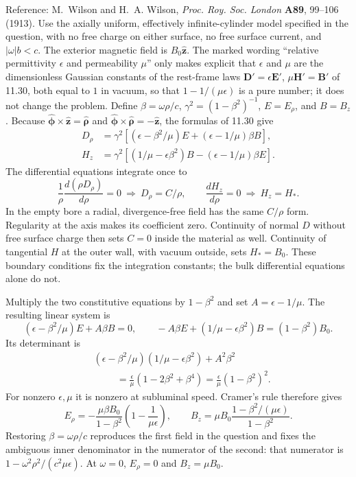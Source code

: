 Reference: M.~Wilson and H.~A. Wilson, \emph{Proc. Roy. Soc. London} \textbf{A89}, 99--106 (1913).
\solution
Use the axially uniform, effectively infinite-cylinder model
specified in the question, with no free charge on either surface,
no free surface current, and $|\omega|b<c$. The exterior magnetic
field is $B_0\hat{\mathbf z}$. The marked wording
``relative permittivity $\epsilon$ and permeability $\mu$'' only
makes explicit that $\epsilon$ and $\mu$ are the dimensionless
Gaussian constants of the rest-frame laws
$\mathbf D'=\epsilon\mathbf E'$, $\mu\mathbf H'=\mathbf B'$
of 11.30, both equal to $1$ in vacuum, so that $1-1/(\mu\epsilon)$
is a pure number; it does not change the problem. Define
$\beta=\omega\rho/c$, $\gamma^2=(1-\beta^2)^{-1}$,
$E=E_\rho$, and $B=B_z$. Because
$\hat{\boldsymbol\phi}\times\hat{\mathbf z}=\hat{\boldsymbol\rho}$
and $\hat{\boldsymbol\phi}\times\hat{\boldsymbol\rho}=-\hat{\mathbf z}$,
the formulas of 11.30 give
\begin{align*}
D_\rho&=\gamma^2[(\epsilon-\beta^2/\mu)E
+(\epsilon-1/\mu)\beta B],\\
H_z&=\gamma^2[(1/\mu-\epsilon\beta^2)B
-(\epsilon-1/\mu)\beta E].
\end{align*}
The differential equations integrate once to
\[
\frac1\rho\frac{d(\rho D_\rho)}{d\rho}=0
\ \Longrightarrow\ D_\rho=C/\rho,
\qquad \frac{dH_z}{d\rho}=0\ \Longrightarrow\ H_z=H_*.
\]
In the empty bore a radial, divergence-free field has the same
$C/\rho$ form. Regularity at the axis makes its coefficient zero.
Continuity of normal $D$ without free surface charge then sets
$C=0$ inside the material as well. Continuity of tangential $H$
at the outer wall, with vacuum outside, sets $H_*=B_0$.
These boundary conditions fix the integration constants; the
bulk differential equations alone do not.

Multiply the two constitutive equations by $1-\beta^2$ and set
$A=\epsilon-1/\mu$. The resulting linear system is
\[
(\epsilon-\beta^2/\mu)E+A\beta B=0,\qquad
-A\beta E+(1/\mu-\epsilon\beta^2)B=(1-\beta^2)B_0.
\]
Its determinant is
\begin{align*}
&(\epsilon-\beta^2/\mu)(1/\mu-\epsilon\beta^2)+A^2\beta^2\\
&\hspace{1cm}=\frac\epsilon\mu(1-2\beta^2+\beta^4)
=\frac\epsilon\mu(1-\beta^2)^2.
\end{align*}
For nonzero $\epsilon,\mu$ it is nonzero at subluminal speed.
Cramer's rule therefore gives
\[
\boxed{E_\rho=-\frac{\mu\beta B_0}{1-\beta^2}
\left(1-\frac1{\mu\epsilon}\right),\qquad
B_z=\mu B_0\frac{1-\beta^2/(\mu\epsilon)}{1-\beta^2}.}
\]
Restoring $\beta=\omega\rho/c$ reproduces the first field in the
question and fixes the ambiguous inner denominator in the numerator
of the second: that numerator is $1-\omega^2\rho^2/(c^2\mu\epsilon)$.
At $\omega=0$, $E_\rho=0$ and $B_z=\mu B_0$.

